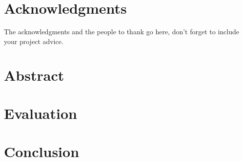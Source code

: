 \documentclass[a4paper,11pt,twoside,openright]{WCarticle}
\begin{document}

\tpage
\pagestyle{plain}

\chapter*{Acknowledgments}
The acknowledgments and the people to thank go here, don't forget to include your project advice. 


\chapter*{Abstract} 

\iffalse
\tableofcontents
\listoffigures
\listoftables
\fi
\cleardoublepage
\pagestyle{fancy}

\iffalse
\chapter{Introduction} \label{chap:intro}\pagenumbering{arabic}



\chapter{Related Work} \label{chap:backgrd}




\chapter{Preliminaries} \label{chap:prelim}\pagenumbering{arabic}



\chapter{Algorithm} \label{chap:alg}



\chapter{Implementation} \label{chap:impl}

\fi
\chapter{Evaluation} \label{chap:eval}


\chapter{Conclusion} \label{chap:conclusion}



\end{document}
